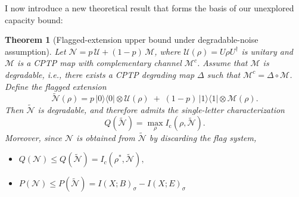 \documentclass[11pt]{article}
\theoremstyle{plain}
\newtheorem{theorem}{Theorem}[section]
\theoremstyle{definition}
\numberwithin{equation}{section}
\begin{document}
I now introduce a new theoretical result that forms the basis of our unexplored capacity bound:



\begin{theorem}[Flagged-extension upper bound under degradable-noise assumption]\label{th22}
Let $\mathcal N = p\,\mathcal U + (1-p)\,\mathcal M$, where $\mathcal U(\rho)=U\rho U^\dagger$ is unitary and
$\mathcal M$ is a CPTP map with complementary channel $\mathcal M^c$.
Assume that $\mathcal M$ is degradable, i.e., there exists a CPTP degrading map
$\Delta$ such that $\mathcal M^c=\Delta\circ\mathcal M$.
Define the flagged extension
\[
\widetilde{\mathcal N}(\rho)= p\,|0\rangle\!\langle 0|\otimes \mathcal U(\rho)\;+\;(1-p)\,|1\rangle\!\langle 1|\otimes \mathcal M(\rho).
\]
Then $\widetilde{\mathcal N}$ is degradable, and therefore admits the single-letter characterization
\[
Q(\widetilde{\mathcal N})=\max_{\rho} I_{\mathrm c}(\rho,\widetilde{\mathcal N}).
\]
Moreover, since $\mathcal N$ is obtained from $\widetilde{\mathcal N}$ by discarding the flag system,
\begin{itemize}
  \item $Q(\mathcal{N}) \leq Q(\widetilde{\mathcal{N}}) = I_c(\rho^*, \widetilde{\mathcal{N}}),$
  \item $P(\mathcal{N}) \leq P(\widetilde{\mathcal{N}}) = I(X;B)_\sigma - I(X;E)_\sigma$
\end{itemize}
\end{theorem}
\end{document}

